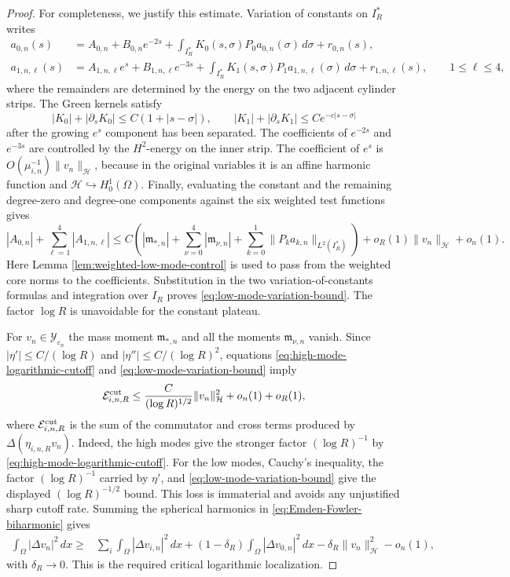 \documentclass[11pt]{article}
\numberwithin{equation}{section}
\begin{document}
\begin{proof}
For completeness, we justify this estimate.  Variation of constants
on $I_R^*$ writes
\[
\begin{aligned}
a_{0,n}(s)
&=A_{0,n}+B_{0,n}e^{-2s}
+\int_{I_R^*}K_0(s,\sigma)P_0a_{0,n}(\sigma)\,d\sigma+r_{0,n}(s),\\
a_{1,n,\ell}(s)
&=A_{1,n,\ell}e^s+B_{1,n,\ell}e^{-3s}
+\int_{I_R^*}K_1(s,\sigma)P_1a_{1,n,\ell}(\sigma)\,d\sigma
+r_{1,n,\ell}(s),
\qquad 1\leq\ell\leq4,
\end{aligned}
\]
where the remainders are determined by the energy on the two
adjacent cylinder strips.  The Green kernels satisfy
\[
|K_0|+|\partial_sK_0|\leq C(1+|s-\sigma|),
\qquad
|K_1|+|\partial_sK_1|
\leq Ce^{-c|s-\sigma|}
\]
after the growing $e^s$ component has been separated.  The
coefficients of $e^{-2s}$ and $e^{-3s}$ are controlled by the
$H^2$-energy on the inner strip.  The coefficient of $e^s$ is
$O(\mu_{i,n}^{-1})\|v_n\|_{\mathcal H}$, because in the original
variables it is an affine harmonic function and
$\mathcal H\hookrightarrow H_0^1(\Omega)$.  Finally, evaluating the
constant and the remaining degree-zero and degree-one components
against the six weighted test functions gives
\[
|A_{0,n}|+\sum_{\ell=1}^4|A_{1,n,\ell}|
\leq C\left(
|\mathfrak m_{*,n}|+\sum_{\nu=0}^4|\mathfrak m_{\nu,n}|
+\sum_{k=0}^1\|P_ka_{k,n}\|_{L^2(I_R^*)}\right)
+o_R(1)\|v_n\|_{\mathcal H}+o_n(1).
\]
Here Lemma \ref{lem:weighted-low-mode-control} is used to pass from
the weighted core norms to the coefficients.  Substitution in the
two variation-of-constants formulas and integration over $I_R$
proves \eqref{eq:low-mode-variation-bound}.  The factor $\log R$ is
unavoidable for the constant plateau.

For $v_n\in\mathcal Y_{\varepsilon_n}$ the mass moment
$\mathfrak m_{*,n}$ and all the moments $\mathfrak m_{\nu,n}$ vanish. Since
$|\eta'|\leq C/(\log R)$ and
$|\eta''|\leq C/(\log R)^2$, equations
\eqref{eq:high-mode-logarithmic-cutoff} and
\eqref{eq:low-mode-variation-bound} imply
\begin{equation}\label{eq:cylindrical-transition-control}
\mathcal E_{i,n,R}^{\rm cut}
\leq
\frac{C}{(\log R)^{1/2}}\|v_n\|_{\mathcal H}^2
+o_n(1)+o_R(1),
\end{equation}
where $\mathcal E_{i,n,R}^{\rm cut}$ is the sum of the commutator
and cross terms produced by $\Delta(\eta_{i,n,R}v_n)$.  Indeed, the
high modes give the stronger factor $(\log R)^{-1}$ by
\eqref{eq:high-mode-logarithmic-cutoff}.  For the low modes,
Cauchy's inequality, the factor $(\log R)^{-1}$ carried by
$\eta'$, and \eqref{eq:low-mode-variation-bound} give the displayed
$(\log R)^{-1/2}$ bound.  This loss is immaterial and avoids any
unjustified sharp cutoff rate.
Summing the spherical harmonics in
\eqref{eq:Emden-Fowler-biharmonic} gives
\begin{equation}\label{eq:quadratic-local-energy}
\begin{aligned}
\int_\Omega|\Delta v_n|^2\,dx
\geq{}&
\sum_i\int_\Omega|\Delta v_{i,n}|^2\,dx
+(1-\delta_R)\int_\Omega|\Delta v_{0,n}|^2\,dx -\delta_R\|v_n\|_{\mathcal H}^2-o_n(1),
\end{aligned}
\end{equation}
with $\delta_R\to0$. This is the required critical logarithmic
localization.


\end{proof}
\end{document}
